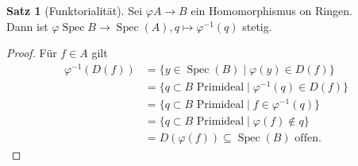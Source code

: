 \documentclass[10pt,a4paper]{article}
\newcommand{\Spec}{\ensuremath{\operatorname{Spec}}}
\newcounter{thm}[section]
\theoremstyle{definition}
\newtheorem{satz}[thm]{Satz}
\theoremstyle{plain}
\theoremstyle{remark}
\begin{document}
\begin{satz}[Funktorialität]
	\label{satz420}
	Sei $\varphi
	A\rightarrow  B$ ein Homomorphismus on Ringen.\\
	Dann ist $\varphi\Spec B\to\Spec(A),q\mapsto \varphi^{-1}(q)$ stetig.
\end{satz}
\begin{proof}
	Für $f\in A$ gilt
	\begin{align*}
	\varphi^{-1}(D(f))&=\{y\in\Spec(B)\mid\varphi(y)\in D(f)\}\\
	&=\{q\subset B\text{ Primideal}\mid\varphi^{-1}(q)\in D(f)\}\\
	&=\{q\subset B\text{ Primideal}\mid f\in \varphi^{-1}(q)\}\\
	&=\{q\subset B\text{ Primideal}\mid\varphi(f)\notin q\}\\
	&=D(\varphi(f))\subseteq\Spec(B)\text{ offen.}
	\end{align*}
\end{proof}
\end{document}
